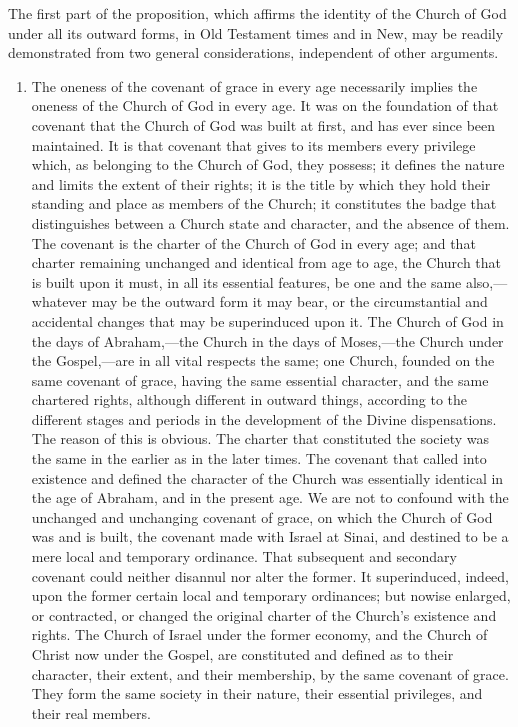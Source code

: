 \documentclass[]{book}
\begin{document}
The first part of the proposition, which affirms the identity of the Church of God under all its outward forms, in Old Testament times and in New, may be readily demonstrated from two general considerations, independent of other arguments.

\begin{enumerate}
\def\labelenumi{\arabic{enumi}.}
\item
  The oneness of the covenant of grace in every age necessarily implies the oneness of the Church of God in every age. It was on the foundation of that covenant that the Church of God was built at first, and has ever since been maintained. It is that covenant that gives to its members every privilege which, as belonging to the Church of God, they possess; it defines the nature and limits the extent of their rights; it is the title by which they hold their standing and place as members of the Church; it constitutes the badge that distinguishes between a Church state and character, and the absence of them. The covenant is the charter of the Church of God in every age; and that charter remaining unchanged and identical from age to age, the Church that is built upon it must, in all its essential features, be one and the same also,---whatever may be the outward form it may bear, or the circumstantial and accidental changes that may be superinduced upon it. The Church of God in the days of Abraham,---the Church in the days of Moses,---the Church under the Gospel,---are in all vital respects the same; one Church, founded on the same covenant of grace, having the same essential character, and the same chartered rights, although different in outward things, according to the different stages and periods in the development of the Divine dispensations. The reason of this is obvious. The charter that constituted the society was the same in the earlier as in the later times. The covenant that called into existence and defined the character of the Church was essentially identical in the age of Abraham, and in the present age. We are not to confound with the unchanged and unchanging covenant of grace, on which the Church of God was and is built, the covenant made with Israel at Sinai, and destined to be a mere local and temporary ordinance. That subsequent and secondary covenant could neither disannul nor alter the former. It superinduced, indeed, upon the former certain local and temporary ordinances; but nowise enlarged, or contracted, or changed the original charter of the Church's existence and rights. The Church of Israel under the former economy, and the Church of Christ now under the Gospel, are constituted and defined as to their character, their extent, and their membership, by the same covenant of grace. They form the same society in their nature, their essential privileges, and their real members.

\end{enumerate}
\end{document}

